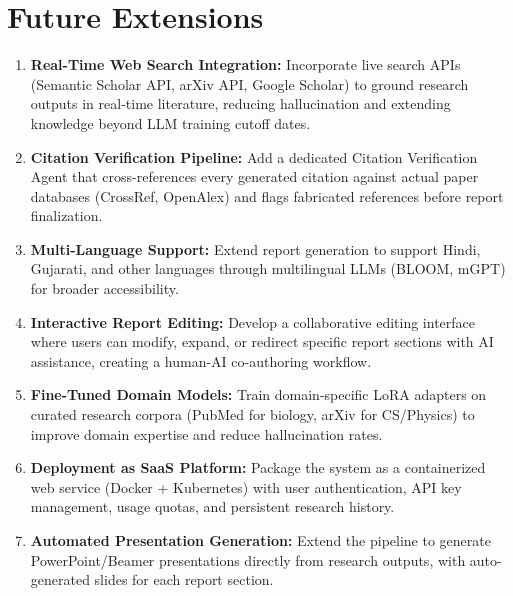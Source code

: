 \section{Future Extensions}

\begin{enumerate}[label=\arabic*., leftmargin=2cm]
\item \textbf{Real-Time Web Search Integration:} Incorporate live search APIs (Semantic Scholar API, arXiv API, Google Scholar) to ground research outputs in real-time literature, reducing hallucination and extending knowledge beyond LLM training cutoff dates.

\item \textbf{Citation Verification Pipeline:} Add a dedicated Citation Verification Agent that cross-references every generated citation against actual paper databases (CrossRef, OpenAlex) and flags fabricated references before report finalization.

\item \textbf{Multi-Language Support:} Extend report generation to support Hindi, Gujarati, and other languages through multilingual LLMs (BLOOM, mGPT) for broader accessibility.

\item \textbf{Interactive Report Editing:} Develop a collaborative editing interface where users can modify, expand, or redirect specific report sections with AI assistance, creating a human-AI co-authoring workflow.

\item \textbf{Fine-Tuned Domain Models:} Train domain-specific LoRA adapters on curated research corpora (PubMed for biology, arXiv for CS/Physics) to improve domain expertise and reduce hallucination rates.

\item \textbf{Deployment as SaaS Platform:} Package the system as a containerized web service (Docker + Kubernetes) with user authentication, API key management, usage quotas, and persistent research history.

\item \textbf{Automated Presentation Generation:} Extend the pipeline to generate PowerPoint/Beamer presentations directly from research outputs, with auto-generated slides for each report section.
\end{enumerate}
